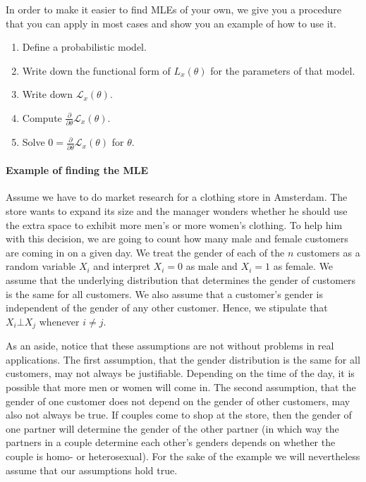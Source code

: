 In order to make it easier to find MLEs of your own, we give you a procedure that you can apply in most cases and
show you an example of how to use it.
\begin{enumerate}
\item Define a probabilistic model.
\item Write down the functional form of $ L_{x}(\theta) $ for the parameters of that model.
\item Write down $ \mathcal{L}_{x}(\theta) $.
\item Compute $ \frac{\partial}{\partial \theta} \mathcal{L}_{x}(\theta) $.
\item Solve $ 0 = \frac{\partial}{\partial \theta} \mathcal{L}_{x}(\theta) $ for $ \theta $.
\end{enumerate}

\paragraph{Example of finding the MLE} Assume we have to do market research for a clothing store in Amsterdam.
The store wants to expand its size and the manager wonders whether he should use the extra space to 
exhibit more men's or more women's clothing. To help him with this decision, we are going to count 
how many male and female customers are coming in on a given day. We treat the gender of each of the $n$ customers
as a random variable $ X_{i}$ and interpret $ X_{i} = 0 $ as male and $ X_{i} = 1 $ as
female. We assume that the underlying distribution that determines the gender of customers
is the same for all customers. We also assume that a customer's gender is independent of the gender of any
other customer. Hence, we stipulate that $ X_{i} \bot X_{j} $ whenever $ i \not = j $.

As an aside, notice that these assumptions are not without problems in real applications. 
The first assumption, that the gender
distribution is the same for all customers, may not always be justifiable. Depending on the time of the day,
it is possible that more men or women will come in. The second assumption, that the gender of one customer
does not depend on the gender of other customers, may also not always be true. If couples come to shop
at the store, then the gender of one partner will determine the gender of the other partner (in which
way the partners in a couple determine each other's genders depends on whether the couple is homo- or
heterosexual). For the sake of the example we will nevertheless assume that our assumptions hold true.

